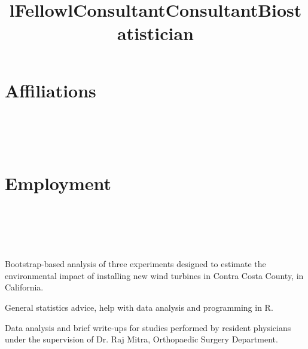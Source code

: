 \documentclass[overlapped,line,letterpaper]{res}
\begin{document}
\begin{resume}
\section{\bf Affiliations}


\begin{format}
\title{l}\\
\\
\body\\
\end{format}

\title{Fellow}
\begin{position}
\end{position}



\section{\bf Employment}

\begin{format}
\\
\title{l}\\
\body\\
\end{format}

\title{Consultant}
\begin{position}
    Bootstrap-based analysis of three experiments designed to estimate
    the environmental impact of installing new wind turbines in
    Contra Costa County, in California.
\end{position}

\title{Consultant}
\begin{position}
    General statistics advice, help with data analysis and programming in R.
\end{position}

\title{Biostatistician}
\begin{position}
    Data analysis and brief write-ups for studies performed by resident
    physicians under the supervision of Dr. Raj Mitra, Orthopaedic Surgery 
    Department.
\end{position}


\end{resume}
\end{document}
